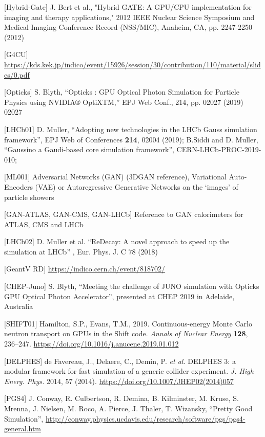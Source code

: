 \documentclass[11pt,a4paper]{article}
\begin{document}
{[}Hybrid-Gate{]} J. Bert et al., "Hybrid GATE: A GPU/CPU implementation
for imaging and therapy applications," 2012 IEEE Nuclear Science
Symposium and Medical Imaging Conference Record (NSS/MIC), Anaheim, CA,
pp. 2247-2250 (2012)

{[}G4CU{]}
\url{https://kds.kek.jp/indico/event/15926/session/30/contribution/110/material/slides/0.pdf}

{[}Opticks{]} S. Blyth, ``Opticks : GPU Optical Photon Simulation for
Particle Physics using NVIDIA® OptiXTM,'' EPJ Web Conf., 214, pp. 02027
(2019) 02027

{[}LHCb01{]} D. Muller, ``Adopting new technologies in the LHCb Gauss
simulation framework'', EPJ Web of Conferences \textbf{214}, 02004
(2019); B.Siddi and D. Muller, ``Gaussino a Gaudi-based core simulation
framework'', CERN-LHCb-PROC-2019-010;

{[}ML001{]} Adversarial Networks (GAN) (3DGAN reference), Variational
Auto-Encoders (VAE) or Autoregressive Generative Networks on the
`images' of particle showers

{[}GAN-ATLAS, GAN-CMS, GAN-LHCb{]} Reference to GAN calorimeters for
ATLAS, CMS and LHCb

{[}LHCb02{]} D. Muller et al. ``ReDecay: A novel approach to speed up
the simulation at LHCb'' , Eur. Phys. J. C 78 (2018)

{[}GeantV RD{]}
\href{https://indico.cern.ch/event/818702/}{{https://indico.cern.ch/event/818702/}}

{[}CHEP-Juno{]} S. Blyth, ``Meeting the challenge of JUNO simulation
with Opticks GPU Optical Photon Accelerator'', presented at CHEP 2019 in
Adelaide, Australia

{[}SHIFT01{]} Hamilton, S.P., Evans, T.M., 2019. Continuous-energy Monte
Carlo neutron transport on GPUs in the Shift code. \emph{Annals of
Nuclear Energy} \textbf{128}, 236--247.
\url{https://doi.org/10.1016/j.anucene.2019.01.012}

{[}DELPHES{]} de Favereau, J., Delaere, C., Demin, P. \emph{et al.}
DELPHES 3: a modular framework for fast simulation of a generic collider
experiment. \emph{J. High Energ. Phys.} 2014, 57 (2014).
\href{https://doi.org/10.1007/JHEP02(2014)057}{{https://doi.org/10.1007/JHEP02(2014)057}}

{[}PGS4{]} J. Conway, R. Culbertson, R. Demina, B. Kilminster, M. Kruse,
S. Mrenna, J. Nielsen, M. Roco, A. Pierce, J. Thaler, T. Wizansky,
``Pretty Good Simulation'',
\href{http://conway.physics.ucdavis.edu/research/software/pgs/pgs4-general.htm}{{http://conway.physics.ucdavis.edu/research/software/pgs/pgs4-general.htm}}
\end{document}
